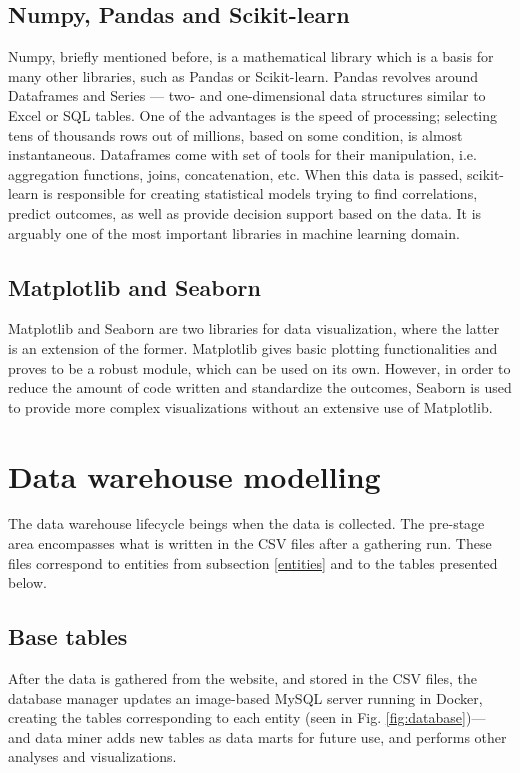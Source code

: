 \subsection{Numpy, Pandas and Scikit-learn}
Numpy, briefly mentioned before, is a mathematical library which is a basis for many other libraries, such as Pandas or Scikit-learn. Pandas revolves around Dataframes and Series --- two- and one-dimensional data structures similar to Excel or SQL tables. One of the advantages is the speed of processing; selecting tens of thousands rows out of millions, based on some condition, is almost instantaneous. Dataframes come with set of tools for their manipulation, i.e. aggregation functions, joins, concatenation, etc. When this data is passed, scikit-learn is responsible for creating statistical models trying to find correlations, predict outcomes, as well as provide decision support based on the data. It is arguably one of the most important libraries in machine learning domain.

\subsection{Matplotlib and Seaborn}
Matplotlib and Seaborn are two libraries for data visualization, where the latter is an extension of the former. Matplotlib gives basic plotting functionalities and proves to be a robust module, which can be used on its own. However, in order to reduce the amount of code written and standardize the outcomes, Seaborn is used to provide more complex visualizations without an extensive use of Matplotlib.


\section{Data warehouse modelling}
The data warehouse lifecycle beings when the data is collected. The pre-stage area encompasses what is written in the CSV files after a gathering run. These files correspond to entities from subsection \ref{entities} and to the tables presented below.

\subsection{Base tables}
\label{ss:base_tables}
After the data is gathered from the website, and stored in the CSV files, the database manager updates an image-based MySQL server running in Docker, creating the tables corresponding to each entity (seen in Fig. \ref{fig:database})--- and data miner adds new tables as data marts for future use, and performs other analyses and visualizations.

